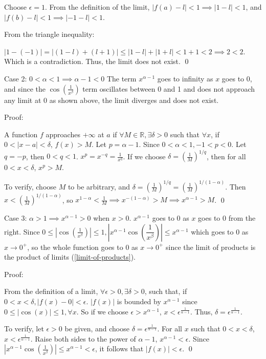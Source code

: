 \documentclass{article}
\begin{document}
Choose $\epsilon=1$. From the definition of the limit, $|f(a)-l|<1 \implies |1-l|<1$, and $|f(b)-l|<1 \implies | -1 -l|<1$.

From the triangle inequality:

$|1-(-1)| = |(1-l)+(l+1)| \le |1-l| + |1+l| < 1+1 < 2 \implies 2<2$. Which is a contradiction. Thus, the limit does not exist. \qed

Case 2: $0<\alpha < 1 \implies \alpha-1<0$ The term $x^{\alpha-1}$ goes to infinity as $x$ goes to 0, and since the $\cos(\frac{1}{x^\beta})$ term
oscillates between 0 and 1 and does not approach any limit at 0 as shown above, the limit diverges and does not exist.

Proof:

A function $f$ approaches $+\infty$ at $a$ if $\forall M \in \mathbb{R}, \exists \delta>0$ such that $\forall x$, if $0< |x-a| <\delta$, $f(x)>M$.
Let $p=\alpha - 1$. Since $0<\alpha<1, -1<p<0$. Let $q=-p$, then $0<q<1$. $x^p=x^{-q}=\frac{1}{x^q}$. If we choose $\delta=(\frac{1}{M})^{1/q}$, then
for all $0<x<\delta$, $x^p>M$.

To verify, choose $M$ to be arbitrary, and $\delta=(\frac{1}{M})^{1/q}=(\frac{1}{M})^{1/(1-\alpha)}$. Then $x<(\frac{1}{M})^{1/(1-\alpha)}$, so
$x^{1-\alpha}<\frac1M \implies x^{-(1-\alpha)} > M \implies x^{\alpha -1} > M$. \qed

Case 3: $\alpha > 1 \implies x^{\alpha -1} > 0$ when $x>0$. $x^{\alpha-1}$ goes to 0 as $x$ goes to 0 from the right. Since
$0 \le |\cos(\frac{1}{x^\beta})| \le 1, |x^{\alpha-1}\cos(\dfrac{1}{x^\beta})| \le x^{\alpha-1}$ which goes to 0 as $x \to 0^+$, so the whole
function goes to 0 as $x \to 0^+$ since the limit of products is the product of limits (\cref{limit-of-products}).

Proof:

From the definition of a limit, $\forall \epsilon>0, \exists \delta>0$, such that, if $0<x<\delta, |f(x)-0|<\epsilon$. $|f(x)|$ is bounded by $x^{\alpha-1}$ since
$0 \le |\cos(x)| \le 1, \forall x$. So if we choose $\epsilon > x^{\alpha-1}$, $x < \epsilon^{\frac{1}{\alpha-1}}$.
Thus, $\delta=\epsilon^{\frac{1}{\alpha-1}}$.

To verify, let $\epsilon > 0$ be given, and choose $\delta=\epsilon^{\frac{1}{\alpha-1}}$. For all $x$ such that $0<x<\delta$, $x<\epsilon^{\frac{1}{\alpha-1}}$.
Raise both sides to the power of $\alpha-1$, $x^{\alpha-1}<\epsilon$. Since $|x^{\alpha-1}\cos(\frac{1}{x^\beta})|\le x^{\alpha-1}<\epsilon$, it
follows that $|f(x)|<\epsilon$. \qed
\end{document}
